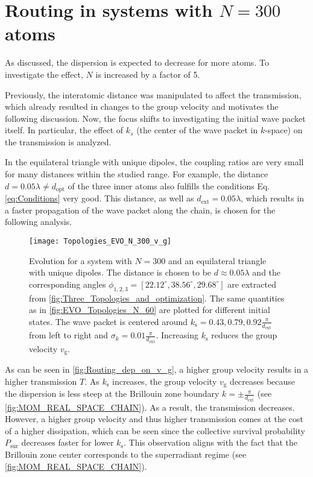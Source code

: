 \section{Routing in systems with \texorpdfstring{$N = 300$}{N = 300} atoms} \label{sec:N_300}
As discussed, the dispersion is expected to decrease for more atoms.
To investigate the effect, $ N $ is increased by a factor of 5.

\noindent
Previously, the interatomic distance was manipulated to affect the transmission, which already resulted in changes to the group velocity and motivates the following discussion.
Now, the focus shifts to investigating the initial wave packet itself.
In particular, the effect of $k_s$ (the center of the wave packet in $k$-space) on the transmission is analyzed.

\noindent
In the equilateral triangle with unique dipoles, the coupling ratios are very small for many distances within the studied range.
For example, the distance $d = 0.05 \lambda \neq d_{\text{opt}}$ of the three inner atoms also fulfills the conditions Eq. \eqref{eq:Conditions} very good.
This distance, as well as $d_\text{ext} = 0.05 \lambda $, which results in a faster propagation of the wave packet along the chain, is chosen for the following analysis.

\begin{figure}[!ht]
    \centering
    \texttt{[image: Topologies\_EVO\_N\_300\_v\_g]}
    \caption{Evolution for a system with $ N = 300 $ and an equilateral triangle with unique dipoles.
    The distance is chosen to be \(d \approx 0.05 \lambda \) and the corresponding angles \( \phi_{1,2,3} = [22.12^\circ, 38.56^\circ, 29.68^\circ] \) are extracted from \autoref{fig:Three_Topologies_and_optimization}.
    The same quantities as in \autoref{fig:EVO_Topologies_N_60} are plotted for different initial states.
    The wave packet is centered around $k_\text{s} = 0.43, 0.79, 0.92 \frac{\pi}{d_\text{ext}} $ from left to right and $ \sigma_k = 0.01 \frac{\pi}{d_\text{ext}} $.
    Increasing $k_\text{s}$ reduces the group velocity $ v_\text{g} $.}
    \label{fig:Routing_dep_on_v_g}
\end{figure}

\noindent
As can be seen in \autoref{fig:Routing_dep_on_v_g}, a higher group velocity results in a higher transmission $T$.
As $ k_\text{s} $ increases,
the group velocity $ v_\text{g} $ decreases because the dispersion is less steep at the Brillouin zone boundary $ k = \pm \frac{\pi}{d_\text{ext}} $ (see \autoref{fig:MOM_REAL_SPACE_CHAIN}).
As a result, the transmission decreases.
However, a higher group velocity and thus higher transmission comes at the cost of a higher dissipation,
which can be seen
since the collective survival probability $P_{\text{sur}}$ decreases faster for lower $ k_{\text{s}}$.
This observation aligns with the fact that the Brillouin zone center corresponds to the superradiant regime (see \autoref{fig:MOM_REAL_SPACE_CHAIN}).

